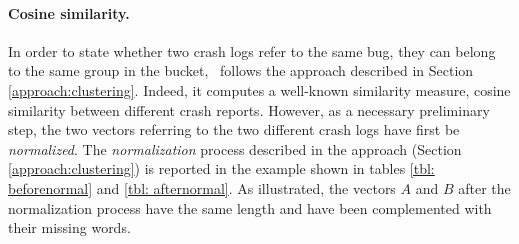 \paragraph{Cosine similarity.} 
In order to state whether two crash logs refer to the same bug, \ie they can belong to the same group in the bucket, \toolname\ follows the approach described in Section \ref{approach:clustering}. 
Indeed, it computes a well-known similarity measure, \ie cosine similarity \cite{cosine} between different crash reports.
However, as a necessary preliminary step, the two vectors referring to the two different crash logs have first be \textit{normalized}. 
The \textit{normalization} process described in the approach (Section \ref{approach:clustering}) is reported in the example shown in tables \ref{tbl: beforenormal} and \ref{tbl: afternormal}.
As illustrated, the vectors $A$ and $B$ after the normalization process have the same length and have been complemented with their missing words. 
